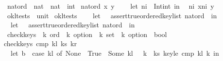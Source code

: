 \begin{isabellebody}
\isanewline
{}\isamarkupfalse%
\ nat{\isacharunderscore}ord\ {\isacharcolon}{\isacharcolon}\ {\isachardoublequoteopen}nat\ {\isasymRightarrow}\ nat\ {\isasymRightarrow}\ int{\isachardoublequoteclose}\ \isanewline
{\isachardoublequoteopen}nat{\isacharunderscore}ord\ x\ y\ {\isacharequal}\ {\isacharparenleft}\isanewline
\ \ let\ n{}i\ {\isacharequal}\ Int{\isachardot}int\ in\isanewline
\ \ {\isacharparenleft}n{}i\ x{\isacharparenright}{\isacharminus}{\isacharparenleft}n{}i\ y{\isacharparenright}{\isacharparenright}{\isachardoublequoteclose}\isanewline
\isanewline
{}\isamarkupfalse%
\ okl{\isacharunderscore}tests\ {\isacharcolon}{\isacharcolon}\ {\isachardoublequoteopen}unit{\isachardoublequoteclose}\ \isanewline
{\isachardoublequoteopen}okl{\isacharunderscore}tests\ {\isacharequal}\ {\isacharparenleft}\isanewline
\ \ let\ {\isacharunderscore}\ {\isacharequal}\ assert{\isacharunderscore}true{\isacharparenleft}ordered{\isacharunderscore}key{\isacharunderscore}list\ nat{\isacharunderscore}ord\ {\isacharbrackleft}{}{\isacharcomma}{}{\isacharcomma}{}{\isacharcomma}{}{\isacharbrackright}{\isacharparenright}\ in\isanewline
\ \ let\ {\isacharunderscore}\ {\isacharequal}\ assert{\isacharunderscore}true{\isacharparenleft}{\isachartilde}{\isacharparenleft}ordered{\isacharunderscore}key{\isacharunderscore}list\ nat{\isacharunderscore}ord\ {\isacharbrackleft}{}{\isacharcomma}{}{\isacharcomma}{}{\isacharcomma}{}{\isacharbrackright}{\isacharparenright}{\isacharparenright}\ in\isanewline
\ \ {\isacharparenleft}{\isacharparenright}{\isacharparenright}{\isachardoublequoteclose}\isanewline
\isanewline
\isanewline
\isanewline
\isanewline
\isanewline
{}\isamarkupfalse%
\ check{\isacharunderscore}keys\ {\isacharcolon}{\isacharcolon}\ {\isachardoublequoteopen}{\isacharprime}k\ ord\ {\isasymRightarrow}\ {\isacharprime}k\ option\ {\isacharequal}{\isachargreater}\ {\isacharprime}k\ set\ {\isacharequal}{\isachargreater}\ {\isacharprime}k\ option\ {\isacharequal}{\isachargreater}\ bool{\isachardoublequoteclose}\ \isanewline
{\isachardoublequoteopen}check{\isacharunderscore}keys\ cmp\ kl\ ks\ kr\ {\isacharequal}\ {\isacharparenleft}\isanewline
\ \ let\ b{}\ {\isacharequal}\ {\isacharparenleft}case\ kl\ of\ None\ {\isacharequal}{\isachargreater}\ True\ {\isacharbar}\ Some\ kl\ {\isacharequal}{\isachargreater}\ {\isacharparenleft}{\isacharbang}\ k\ {\isacharcolon}\ ks{\isachardot}\ key{\isacharunderscore}le\ cmp\ kl\ k{\isacharparenright}{\isacharparenright}\ in\isanewline

\end{isabellebody}
